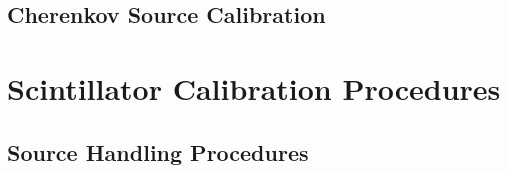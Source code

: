 \documentclass[10pt]{report}
\begin{document}
\chapter{Cherenkov Source Calibration}


\part{Scintillator Calibration Procedures}
\chapter{Source Handling Procedures}



\end{document}
